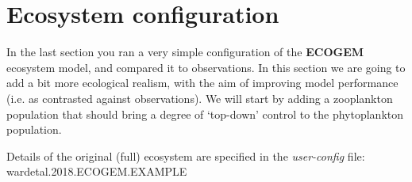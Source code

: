 \documentclass[11pt,fleqn]{book} %
\begin{document}
\newpage


\section{Ecosystem configuration}

In the last section you ran a very simple configuration of the \textbf{ECOGEM} ecosystem model, and compared it to observations. In this section we are going to add a bit more ecological realism, with the aim of improving model performance (i.e. as contrasted against observations). We will start by adding a zooplankton population that  should bring a degree of `top-down' control to the phytoplankton population. 
\vspace{2mm}

Details of the original (full) ecosystem are specified in the \textit{user-config} file:\\ \indent \textsf{\footnotesize wardetal.2018.ECOGEM.EXAMPLE}
\end{document}
